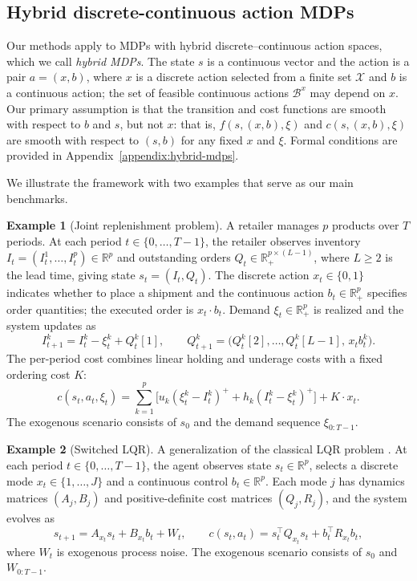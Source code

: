 \documentclass{article}
\theoremstyle{definition}
\newtheorem{example}{Example}
\theoremstyle{remark}
\begin{document}
\subsection{Hybrid discrete-continuous action MDPs}
\label{sec:hybrid-mdps}

Our methods apply to MDPs with hybrid discrete--continuous action spaces, which we call 
\textit{hybrid MDPs}. The state $s$ is a continuous vector and the action is a pair 
$a=(x,b)$, where $x$ is a discrete action selected from a finite set $\mathcal{X}$ and 
$b$ is a continuous action; the set of feasible continuous actions $\mathcal{B}^x$ may depend on 
$x$. Our primary assumption is that the transition and cost functions are smooth with 
respect to $b$ and $s$, but not $x$: that is, $f(s,(x,b),\xi)$ and $c(s,(x,b),\xi)$ 
are smooth with respect to $(s,b)$ for any fixed $x$ and $\xi$. Formal conditions are 
provided in Appendix~\ref{appendix:hybrid-mdps}.

We illustrate the framework with two examples that serve as our main benchmarks.

\begin{example}[Joint replenishment problem]\label{ex:jrp}
A retailer manages $p$ products over $T$ periods. At each period $t\in\{0,\ldots,T-1\}$, 
the retailer observes inventory $I_t=(I_t^1,\ldots,I_t^p)\in\mathbb{R}^p$ and outstanding 
orders $Q_t\in\mathbb{R}_+^{p\times(L-1)}$, where $L\geq 2$ is the lead time, giving state 
$s_t=(I_t,Q_t)$. The discrete action $x_t\in\{0,1\}$ indicates whether to place a shipment 
and the continuous action $b_t\in\mathbb{R}_+^p$ specifies order quantities; the 
executed order is $x_t\cdot b_t$. Demand $\xi_t\in\mathbb{R}_+^p$ is realized and the 
system updates as
\begin{equation*}
    I_{t+1}^k = I_t^k - \xi_t^k + Q_t^k[1], \qquad 
    Q_{t+1}^k = \bigl(Q_t^k[2],\ldots,Q_t^k[L-1],\,x_t b_t^k\bigr).
\end{equation*}
The per-period cost combines linear holding and underage costs with a fixed ordering cost $K$:
\begin{equation*}
    c(s_t,a_t,\xi_t) = \sum_{k=1}^p\bigl[u_k(\xi_t^k-I_t^k)^+ + h_k(I_t^k-\xi_t^k)^+\bigr] 
    + K\cdot x_t.
\end{equation*}
The exogenous scenario consists of $s_0$ and the demand sequence $\xi_{0:T-1}$.
\end{example}

\begin{example}[Switched LQR]\label{ex:slqr}
A generalization of the classical LQR problem \citep{kalman1960contributions}. At each period 
$t\in\{0,\ldots,T-1\}$, the agent observes state $s_t\in\mathbb{R}^p$, selects a discrete 
mode $x_t\in\{1,\ldots,J\}$ and a continuous control $b_t\in\mathbb{R}^p$. Each mode $j$ 
has dynamics matrices $(A_j,B_j)$ and positive-definite cost matrices $(Q_j,R_j)$, and 
the system evolves as
\begin{equation*}
    s_{t+1} = A_{x_t}s_t + B_{x_t}b_t + W_t, \qquad 
    c(s_t,a_t) = s_t^\top Q_{x_t}s_t + b_t^\top R_{x_t}b_t,
\end{equation*}
where $W_t$ is exogenous process noise. The exogenous scenario consists of $s_0$ and 
$W_{0:T-1}$. 
\end{example}
\end{document}

